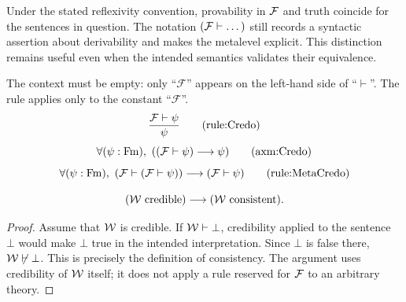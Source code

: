 Under the stated reflexivity convention, provability in ${\mathcal{F}}$ and truth
coincide for the sentences in question. The notation $({\mathcal{F}}\vdash\dots)$
still records a syntactic assertion about derivability and makes the
metalevel explicit. This distinction remains useful even when the intended
semantics validates their equivalence. %

\begin{inferencerule}[creed]%
The context must be empty: only ``$\mathcal{F}$'' appears on the left-hand side of ``$\vdash$''. The rule applies only to the constant ``$\mathcal{F}$''.
\label{rule:creed}
%
\[
\frac{
\mathcal{F}\vdash\psi
}{
\psi
}
\labeltagd{rule}{Credo}
\]
\[
\forall (\psi:\Fm),\ %
(
(\mathcal{F}\vdash\psi)
\implies
\psi
)
\labeltagd{axm}{Credo}
\]
\[
\forall (\psi:\Fm),\ %
(\mathcal{F}\vdash(\mathcal{F}\vdash\psi))
\implies
(\mathcal{F}\vdash\psi)
\labeltagd{rule}{MetaCredo}
\]

\end{inferencerule}

\begin{theorem}
\[
({\mathcal{W}}\text{ credible})
\longrightarrow
({\mathcal{W}}\text{ consistent}).
\]
\end{theorem}
\begin{proof}
Assume that ${\mathcal{W}}$ is credible. If ${\mathcal{W}}\vdash\bot$, credibility applied to
the sentence $\bot$ would make $\bot$ true in the intended interpretation.
Since $\bot$ is false there, ${\mathcal{W}}\not\vdash\bot$. This is precisely the
definition of consistency. The argument uses credibility of ${\mathcal{W}}$ itself;
it does not apply a rule reserved for ${\mathcal{F}}$ to an arbitrary theory.
\end{proof}

